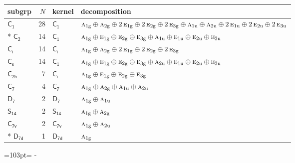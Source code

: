 \documentclass[10pt,a4paper]{article}
\newcommand{\needspace}[1]{\par\penalty-100\begingroup\dimen0=#1\relax\dimen2=\pagegoal
  \advance\dimen2-\pagetotal\ifdim\dimen0>\dimen2\relax\ifdim\dimen2>0pt\vfil\break\fi\fi
  \endgroup}
\numberwithin{equation}{section}
\newcommand{\grp}[1]{\mathsf{#1}}
\newcommand{\irr}[1]{\text{\normalfont\scshape #1}}
\newcommand{\ptag}[1]{\mathrm{#1}}
\newlength{\fillwidth}\newlength{\cellwidth}\newlength{\colwidth}
\begin{document}
{\begin{longtable}{@{}lrl>{\RaggedRight\arraybackslash}p{\fillwidth}@{}}
subgrp & $N$ & kernel & decomposition\\\midrule\endhead
\bottomrule\endfoot\endlastfoot
\href{C1.pdf}{$\grp{C_{1}}$} & 28 & \href{C1.pdf}{$\grp{C_{1}}$} & $\irr{a}_{1\ptag{g}}\oplus \irr{a}_{2\ptag{g}}\oplus 2\,\irr{e}_{1\ptag{g}}\oplus 2\,\irr{e}_{2\ptag{g}}\oplus 2\,\irr{e}_{3\ptag{g}}\oplus \irr{a}_{1\ptag{u}}\oplus \irr{a}_{2\ptag{u}}\oplus 2\,\irr{e}_{1\ptag{u}}\oplus 2\,\irr{e}_{2\ptag{u}}\oplus 2\,\irr{e}_{3\ptag{u}}$\\*
\href{C2.pdf}{$\grp{C_{2}}$} & 14 & \href{C1.pdf}{$\grp{C_{1}}$} & $\irr{a}_{1\ptag{g}}\oplus \irr{e}_{1\ptag{g}}\oplus \irr{e}_{2\ptag{g}}\oplus \irr{e}_{3\ptag{g}}\oplus \irr{a}_{1\ptag{u}}\oplus \irr{e}_{1\ptag{u}}\oplus \irr{e}_{2\ptag{u}}\oplus \irr{e}_{3\ptag{u}}$\\
\href{S2.pdf}{$\grp{C_{i}}$} & 14 & \href{S2.pdf}{$\grp{C_{i}}$} & $\irr{a}_{1\ptag{g}}\oplus \irr{a}_{2\ptag{g}}\oplus 2\,\irr{e}_{1\ptag{g}}\oplus 2\,\irr{e}_{2\ptag{g}}\oplus 2\,\irr{e}_{3\ptag{g}}$\\
\href{C1v.pdf}{$\grp{C_{s}}$} & 14 & \href{C1.pdf}{$\grp{C_{1}}$} & $\irr{a}_{1\ptag{g}}\oplus \irr{e}_{1\ptag{g}}\oplus \irr{e}_{2\ptag{g}}\oplus \irr{e}_{3\ptag{g}}\oplus \irr{a}_{2\ptag{u}}\oplus \irr{e}_{1\ptag{u}}\oplus \irr{e}_{2\ptag{u}}\oplus \irr{e}_{3\ptag{u}}$\\
\href{C2h.pdf}{$\grp{C_{2h}}$} & 7 & \href{S2.pdf}{$\grp{C_{i}}$} & $\irr{a}_{1\ptag{g}}\oplus \irr{e}_{1\ptag{g}}\oplus \irr{e}_{2\ptag{g}}\oplus \irr{e}_{3\ptag{g}}$\\
\href{C7.pdf}{$\grp{C_{7}}$} & 4 & \href{C7.pdf}{$\grp{C_{7}}$} & $\irr{a}_{1\ptag{g}}\oplus \irr{a}_{2\ptag{g}}\oplus \irr{a}_{1\ptag{u}}\oplus \irr{a}_{2\ptag{u}}$\\
\href{D7.pdf}{$\grp{D_{7}}$} & 2 & \href{D7.pdf}{$\grp{D_{7}}$} & $\irr{a}_{1\ptag{g}}\oplus \irr{a}_{1\ptag{u}}$\\
\href{S14.pdf}{$\grp{S_{14}}$} & 2 & \href{S14.pdf}{$\grp{S_{14}}$} & $\irr{a}_{1\ptag{g}}\oplus \irr{a}_{2\ptag{g}}$\\
\href{C7v.pdf}{$\grp{C_{7v}}$} & 2 & \href{C7v.pdf}{$\grp{C_{7v}}$} & $\irr{a}_{1\ptag{g}}\oplus \irr{a}_{2\ptag{u}}$\\*
\href{D7d.pdf}{$\grp{D_{7d}}$} & 1 & \href{D7d.pdf}{$\grp{D_{7d}}$} & $\irr{a}_{1\ptag{g}}$\\
\bottomrule\end{longtable}}
\needspace{103pt}
\end{document}

